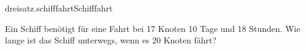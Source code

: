 \begin{exercise}{dreisatz.schifffahrt}{Schifffahrt}
  \ifproblem\problem\par
    Ein Schiff benötigt für eine Fahrt bei 17 Knoten 10 Tage und 18 Stunden.
    Wie lange ist das Schiff unterwegs, wenn es 20 Knoten fährt?
  \fi
\end{exercise}
